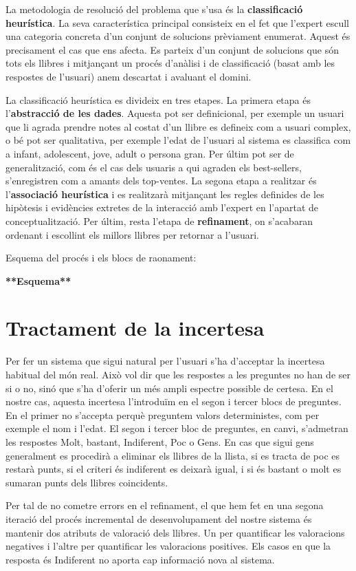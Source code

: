 La metodologia de resolució del problema que s'usa és la \textbf{classificació heurística}. La seva característica principal consisteix en el fet que l'expert escull una categoria concreta d'un conjunt de solucions prèviament enumerat. Aquest és precisament el cas que ens afecta. Es parteix d'un conjunt de solucions que són tots els llibres i mitjançant un procés d'anàlisi i de classificació (basat amb les respostes de l'usuari) anem descartat i avaluant el domini.

La classificació heurística es divideix en tres etapes. La primera etapa és l'\textbf{abstracció de les dades}. Aquesta pot ser definicional, per exemple un usuari que li agrada prendre notes al costat d'un llibre es defineix com a usuari complex, o bé pot ser qualitativa, per exemple l'edat de l'usuari al sistema es classifica com a infant, adolescent, jove, adult o persona gran. Per últim pot ser de generalització, com és el cas dels usuaris a qui agraden els best-sellers, s'enregistren com a amants dels top-ventes. La segona etapa a realitzar és l'\textbf{associació heurística} i es realitzarà mitjançant les regles definides de les hipòtesis i evidències extretes de la interacció amb l'expert en l'apartat de conceptualització. Per últim, resta l'etapa de \textbf{refinament}, on s'acabaran ordenant i escollint els millors llibres per retornar a l'usuari.

Esquema del procés i els blocs de raonament:

\textbf{**Esquema**}

\section{Tractament de la incertesa}

Per fer un sistema que sigui natural per l'usuari s'ha d'acceptar la incertesa habitual del món real. Això vol dir que les respostes a les preguntes no han de ser si o no, sinó que s'ha d'oferir un més ampli espectre possible de certesa. En el nostre cas, aquesta incertesa l'introduïm en el segon i tercer blocs de preguntes. En el primer no s'accepta perquè preguntem valors deterministes, com per exemple el nom i l'edat. El segon i tercer bloc de preguntes, en canvi, s'admetran les respostes Molt, bastant, Indiferent, Poc o Gens. En cas que sigui gens generalment es procedirà a eliminar els llibres de la llista, si es tracta de poc es restarà punts, si el criteri és indiferent es deixarà igual, i si és bastant o molt es sumaran punts dels llibres coincidents.

Per tal de no cometre errors en el refinament, el que hem fet en una segona iteració del procés incremental de desenvolupament del nostre sistema és mantenir dos atributs de valoració dels llibres. Un per quantificar les valoracions negatives i l'altre per quantificar les valoracions positives. Els casos en que la resposta és Indiferent no aporta cap informació nova al sistema.



